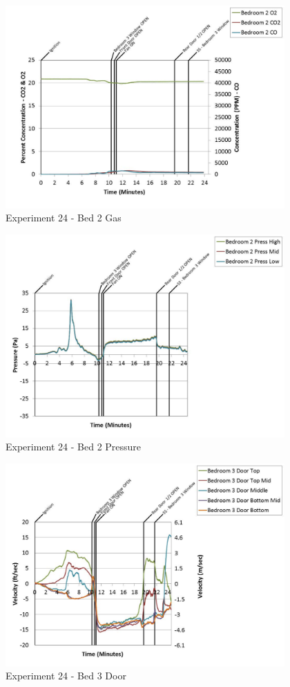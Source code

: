 \documentclass{article}
\begin{document}
\begin{appendices}
	\begin{figure}[h!]
		\centering
		\includegraphics[height=3.05in]{0_Images/Results_Charts/Exp_24_Charts/Bed2Gas.pdf}
		\caption{Experiment 24 - Bed 2 Gas}
	\end{figure}
 
	\clearpage

	\begin{figure}[h!]
		\centering
		\includegraphics[height=3.05in]{0_Images/Results_Charts/Exp_24_Charts/Bed2Pressure.pdf}
		\caption{Experiment 24 - Bed 2 Pressure}
	\end{figure}
 

	\begin{figure}[h!]
		\centering
		\includegraphics[height=3.05in]{0_Images/Results_Charts/Exp_24_Charts/Bed3Door.pdf}
		\caption{Experiment 24 - Bed 3 Door}
	\end{figure}
 

\end{appendices}
\end{document}
